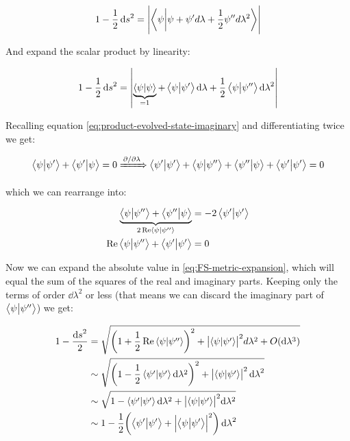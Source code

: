 \documentclass[main.tex]{subfiles}
\begin{document}
\begin{equation}
1-\frac{1}{2} \dd{s}^2 = \abs{\braket{\psi}{\psi + \psi'd\lambda + \frac{1}{2}\psi'' d\lambda^2}}
\end{equation}

And expand the scalar product by linearity:

\begin{equation}
1-\frac{1}{2}\dd{s}^2 = \abs{ \underbrace{\braket{\psi}{\psi} }_{=1}+ \braket{\psi}{\psi'}\dd{\lambda} + \frac{1}{2} \braket{\psi}{\psi''}\dd{\lambda}^2 }
\label{eq:FS-metric-expansion}
\end{equation}

Recalling equation \eqref{eq:product-evolved-state-imaginary} and differentiating twice we get:

\begin{equation}
 \braket{\psi}{\psi'} + \braket{\psi'}{\psi} =0 \xRightarrow{\pdv*{}{\lambda}} \braket{\psi'}{\psi'} + \braket{\psi}{\psi''} + \braket{\psi''}{\psi} + \braket{\psi'}{\psi'} = 0
\end{equation}

which we can rearrange into:

\begin{subequations}
\begin{align}
    \underbrace{\braket{\psi}{\psi''} + \braket{\psi''}{\psi}}_{2\Re\braket{\psi}{\psi''}} &= -2\braket{\psi'}{\psi'} \\
    \Re\braket{\psi}{\psi''} +\braket{\psi'}{\psi'}&=0
\end{align}
\end{subequations}

Now we can expand the absolute value in \eqref{eq:FS-metric-expansion}, which will equal the sum of the squares of the real and imaginary parts. Keeping only the terms of order \(\dd{\lambda}^2\) or less (that means we can discard the imaginary part of \(\braket{\psi}{\psi''}\)) we get:

\begin{subequations}
\begin{align}
1 - \frac{\dd{s}^2}{2} &=\sqrt{\left(1+\frac{1}{2}\Re\braket{\psi}{\psi''}\right)^2 + \abs{\braket{\psi}{\psi'}}^2 d\lambda^2 + O(\dd\lambda^3)}  \\
&\sim \sqrt{\left(1-\frac{1}{2}\braket{\psi'}{\psi'} \dd\lambda^2\right)^2 + \abs{\braket{\psi}{\psi'}}^2 \dd{\lambda}^2 } \\
&\sim \sqrt{1-\braket{\psi'}{\psi' }\dd\lambda^2 + \abs{\braket{\psi}{\psi'}}^2 \dd\lambda^2}  \\
&\sim 1- \frac{1}{2} \qty(\braket{\psi'}{\psi' } + \abs{\braket{\psi}{\psi'}}^2) \dd{\lambda}^2
\end{align}
\end{subequations}
\end{document}

